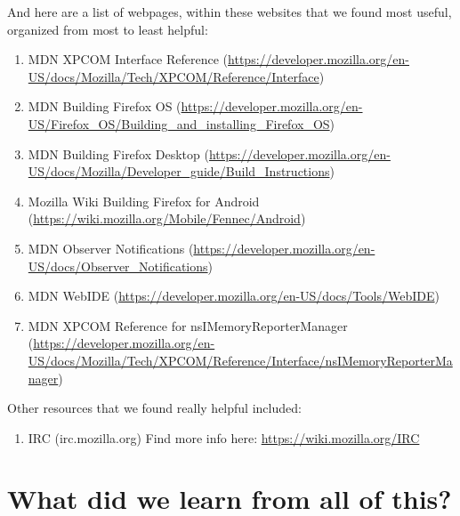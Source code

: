 \documentclass[12pt]{article}
\begin{document}
And here are a list of webpages, within these websites that we found most useful, organized from most to least helpful:
\begin{enumerate}
	\item MDN XPCOM Interface Reference (\href{https://developer.mozilla.org/en-US/docs/Mozilla/Tech/XPCOM/Reference/Interface}{https://developer.mozilla.org/en-US/docs/Mozilla/Tech/XPCOM/Reference/Interface})
	\item MDN Building Firefox OS (\href{https://developer.mozilla.org/en-US/Firefox_OS/Building_and_installing_Firefox_OS}{https://developer.mozilla.org/en-US/Firefox_OS/Building_and_installing_Firefox_OS})
	\item MDN Building Firefox Desktop (\href{https://developer.mozilla.org/en-US/docs/Mozilla/Developer_guide/Build_Instructions}{https://developer.mozilla.org/en-US/docs/Mozilla/Developer_guide/Build_Instructions})
	\item Mozilla Wiki Building Firefox for Android (\href{https://wiki.mozilla.org/Mobile/Fennec/Android}{https://wiki.mozilla.org/Mobile/Fennec/Android})
	\item MDN Observer Notifications (\href{https://developer.mozilla.org/en-US/docs/Observer_Notifications}{https://developer.mozilla.org/en-US/docs/Observer\_Notifications})
	\item MDN WebIDE (\href{https://developer.mozilla.org/en-US/docs/Tools/WebIDE}{https://developer.mozilla.org/en-US/docs/Tools/WebIDE})
	\item MDN XPCOM Reference for nsIMemoryReporterManager (\href{https://developer.mozilla.org/en-US/docs/Mozilla/Tech/XPCOM/Reference/Interface/nsIMemoryReporterManager}{https://developer.mozilla.org/en-US/docs/Mozilla/Tech/XPCOM/Reference/Interface/nsIMemoryReporterManager})
\end{enumerate}

\noindent Other resources that we found really helpful included:
\begin{enumerate}
	\item IRC (irc.mozilla.org)
		\subitem Find more info here: \href{https://wiki.mozilla.org/IRC}{https://wiki.mozilla.org/IRC}
\end{enumerate}
\pagebreak

\section{What did we learn from all of this?}
\end{document}
